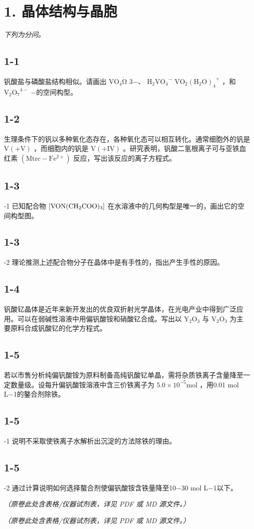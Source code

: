 \section*{1. 晶体结构与晶胞}
\textit{下列为分问。}

\subsection*{1-1}
钒酸盐与磷酸盐结构相似。请画出 $\mathrm { V O } _ { 4 } \mathrm { \dot { \Omega } }$ 3−、 $\mathrm { H _ { 2 } V O _ { 4 } } ^ { - }$ $\mathrm { V O _ { 2 } ( H _ { 2 } O ) _ { 4 } } ^ { + }$ ，和 $\mathrm { V _ { 2 } O _ { 7 } } ^ { 4 - }$ −的空间构型。

\subsection*{1-2}
⽣理条件下的钒以多种氧化态存在，各种氧化态可以相互转化。通常细胞外的钒是 $\mathrm { V } ( + \mathrm { V } )$ ，⽽细胞内的钒是 $\mathrm { V } ( + \mathrm { I V } )$ 。研究表明，钒酸⼆氢根离⼦可与亚铁⾎红素 $\mathrm { ( M t r c - F e ^ { 2 + } ) }$ 反应，写出该反应的离⼦⽅程式。

\subsection*{1-3}
-1 已知配合物 $\mathrm { \small { [ V O N ( C H _ { 2 } C O O ) _ { 3 } ] } }$ 在⽔溶液中的⼏何构型是唯⼀的，画出它的空间构型图。

\subsection*{1-3}
-2 理论推测上述配合物分⼦在晶体中是有⼿性的，指出产⽣⼿性的原因。

\subsection*{1-4}
钒酸钇晶体是近年来新开发出的优良双折射光学晶体，在光电产业中得到⼴泛应⽤。可以在弱碱性溶液中⽤偏钒酸铵和硝酸钇合成。写出以 $\mathrm { Y _ { 2 } O _ { 3 } }$ 与 $\mathrm { { V } _ { 2 } O _ { 3 } }$ 为主要原料合成钒酸钇的化学⽅程式。

\subsection*{1-5}
若以市售分析纯偏钒酸铵为原料制备⾼纯钒酸钇单晶，需将杂质铁离⼦含量降⾄⼀定数量级。设每升偏钒酸铵溶液中含三价铁离⼦为 $5 . 0 { \times } 1 0 ^ { - 5 } \mathrm { m o l }$ ，⽤0.01 mol L−1的鏊合剂除铁。

\subsection*{1-5}
-1 说明不采取使铁离⼦⽔解析出沉淀的⽅法除铁的理由。

\subsection*{1-5}
-2 通过计算说明如何选择螯合剂使偏钒酸铵含铁量降⾄10−30 mol L−1以下。

\textit{（原卷此处含表格/仪器试剂表，详见 PDF 或 MD 源文件。）}

\textit{（原卷此处含表格/仪器试剂表，详见 PDF 或 MD 源文件。）}
